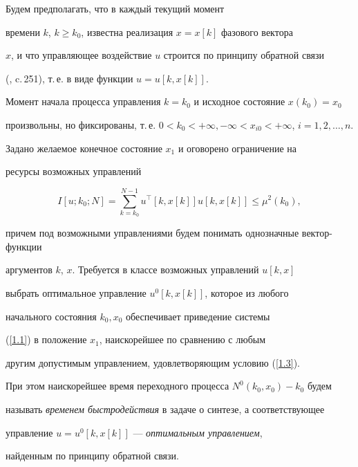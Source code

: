 \begin{probs}


Будем предполагать, что в каждый текущий момент


времени $k$, $k\ge k_0$, известна реализация $x=x[k]$ фазового вектора


$x$, и что управляющее воздействие $u$ строится по принципу обратной связи


(\cite{Kras}, c.\,251), т.\,е. в виде функции $u=u[k, x[k]]$.


Момент начала процесса управления $k = k_0$ и исходное состояние $x(k_0)=x_0$


произвольны, но фиксированы, т.\,е. $0 < k_0 < +\infty,-\infty < x_{i 0} <


+\infty$, $i=1, 2, \dotsc, n$.


Задано желаемое конечное состояние $x_1$ и оговорено ограничение на


ресурсы возможных управлений


\begin{equation}\label{1.3}


I[u; k_0; N] = \sum_{k=k_0}^{N-1} u^{\top}[k,


x[k]] u[k, x[k]] \le \mu^2(k_0),


\end{equation}


причем под возможными управлениями будем понимать однозначные вектор-функции


аргументов $k$, $x$. Требуется в классе возможных управлений $u[k, x]$


выбрать оптимальное управление $u^0[k, x[k]]$, которое из любого


начального состояния $k_0, x_0$ обеспечивает приведение системы


(\ref{1.1}) в положение $x_1$, наискорейшее  по сравнению с любым


другим допустимым управлением, удовлетворяющим условию (\ref{1.3}).





При этом наискорейшее время переходного процесса $N^0(k_0, x_0)-k_0$ будем


называть {\it временем быстродействия} в задаче о синтезе, а соответствующее


управление $u=u^0[k, x[k]]$ --- {\it оптимальным управлением},


найденным по принципу обратной связи.


\end{probs}





